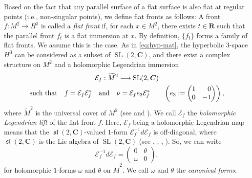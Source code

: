 \documentclass[a4paper]{amsart}
\theoremstyle{plain}
\theoremstyle{remark}
\numberwithin{equation}{section}
\begin{document}
Based on the fact that any parallel surface of a flat surface 
is also flat at regular points (i.e., non-singular points), 
we define flat fronts as follows:
A front $f\colon{}M^2\to H^3$ is called a {\em flat front\/} 
if, for each $x\in M^2$, there exists $t\in{\boldsymbol{R}}$ such that the
parallel front $f_t$ is a flat immersion at $x$. 
By definition, $\{f_t\}$ forms a family of flat fronts.
We assume this is the case.
As in \eqref{eq:hyp-mat}, the hyperbolic 3-space $H^3$
can be considered as a subset of ${\operatorname{SL}}(2,{\boldsymbol{C}})$,
and there exist a complex structure on $M^2$ and 
a holomorphic Legendrian immersion
\begin{multline}\label{eq:hol-lift}
   {\mathcal{E}}_f:\widetilde M^2\longrightarrow {\operatorname{SL}}(2,{\boldsymbol{C}})\\
   \text{such that}\quad f={\mathcal{E}}_f{\mathcal{E}}_f^* 
   \quad \text{and}\quad
   \nu = {\mathcal{E}}_f e_3 {\mathcal{E}}_f^*\qquad 
    \left( e_3 := \begin{pmatrix}  
                 1 & \hphantom{-} 0 \\
	         0 &  -1 
	   \end{pmatrix}\right),
\end{multline}
where $\widetilde M^2$ is the universal cover of $M^2$ 
(see \cite{GMM} and \cite{KUY1}).
We call ${\mathcal{E}}_f$ the {\em holomorphic Legendrian lift\/} of the 
flat front $f$.
Here, ${\mathcal{E}}_f$ being a holomorphic Legendrian map means that 
the ${\operatorname{\mathfrak{sl}}} (2, {\boldsymbol{C}})$-valued $1$-form 
${\mathcal{E}}_f^{-1}d{\mathcal{E}}_f$ is off-diagonal, 
where ${\operatorname{\mathfrak{sl}}}(2,{\boldsymbol{C}})$ is the Lie algebra of ${\operatorname{SL}}(2,{\boldsymbol{C}})$
(see \cite{GMM}, \cite{KUY1}, \cite{KUY2}, \cite{KRUY}).
So, we can write
\begin{equation}\label{eq:can-form}
 {\mathcal{E}}_f^{-1}d{\mathcal{E}}_f=
  \begin{pmatrix}
   0 & \theta \\
   \omega & 0
  \end{pmatrix},
\end{equation}
for holomorphic $1$-forms $\omega$ and $\theta$ on 
$\widetilde{M}^2$. We call $\omega$ and $\theta$ the {\em canonical forms}.
\end{document}
